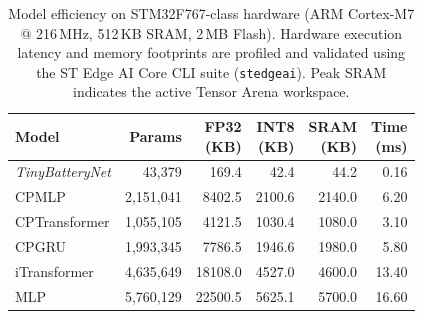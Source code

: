 \begin{table}[t]
\centering
\caption{Model efficiency on STM32F767-class hardware (ARM Cortex-M7 @ 216\,MHz, 512\,KB SRAM, 2\,MB Flash). Hardware execution latency and memory footprints are profiled and validated using the ST Edge AI Core CLI suite (\texttt{stedgeai}). Peak SRAM indicates the active Tensor Arena workspace.}
\label{tab:efficiency_stm32f767}
\small
\setlength{\tabcolsep}{2.5pt}
\begin{tabular*}{\columnwidth}{@{\extracolsep{\fill}}lrrrrr@{}}
\toprule
\textbf{Model} & \textbf{Params} & \makecell{\textbf{FP32}\\\textbf{(KB)}} & \makecell{\textbf{INT8}\\\textbf{(KB)}} & \makecell{\textbf{SRAM}\\\textbf{(KB)}} & \makecell{\textbf{Time}\\\textbf{(ms)}} \\
\midrule
\textit{TinyBatteryNet} & 43,379 & 169.4 & 42.4 & 44.2 & 0.16 \\
CPMLP & 2,151,041 & 8402.5 & 2100.6 & 2140.0 & 6.20 \\
CPTransformer & 1,055,105 & 4121.5 & 1030.4 & 1080.0 & 3.10 \\
CPGRU & 1,993,345 & 7786.5 & 1946.6 & 1980.0 & 5.80 \\
iTransformer & 4,635,649 & 18108.0 & 4527.0 & 4600.0 & 13.40 \\
MLP & 5,760,129 & 22500.5 & 5625.1 & 5700.0 & 16.60 \\
\bottomrule
\end{tabular*}
\end{table}
